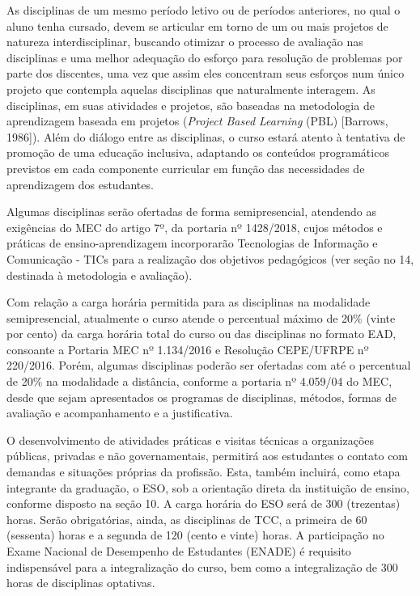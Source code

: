 As disciplinas de um mesmo período letivo ou de períodos anteriores, no qual o aluno tenha cursado, devem se articular em torno de um ou mais projetos de natureza interdisciplinar, buscando otimizar o processo de avaliação nas disciplinas e uma melhor adequação do esforço para resolução de problemas por parte dos discentes, uma vez que assim eles concentram seus esforços num único projeto que contempla aquelas disciplinas que naturalmente interagem. As disciplinas, em suas atividades e projetos, são baseadas na metodologia de aprendizagem baseada em projetos (\textit{Project Based Learning} (PBL) [Barrows, 1986]). Além do diálogo entre as disciplinas, o curso estará atento à tentativa de promoção de uma educação inclusiva, adaptando os conteúdos programáticos previstos em cada componente curricular em função das necessidades de aprendizagem dos estudantes.

Algumas disciplinas serão ofertadas de forma semipresencial, atendendo as exigências do MEC do artigo 7º, da portaria nº 1428/2018, cujos métodos e práticas de ensino-aprendizagem incorporarão Tecnologias de Informação e Comunicação - TICs para a realização dos objetivos pedagógicos (ver seção no 14, destinada à metodologia e avaliação).

Com relação a carga horária permitida para as disciplinas na modalidade semipresencial, atualmente o curso atende o percentual máximo de 20\% (vinte por cento) da carga horária total do curso ou das disciplinas no formato EAD, consoante a Portaria MEC nº 1.134/2016 e Resolução CEPE/UFRPE nº 220/2016. Porém, algumas disciplinas poderão ser ofertadas com até o percentual de 20\% na modalidade a distância, conforme a portaria nº 4.059/04 do MEC, desde que sejam apresentados os programas de disciplinas, métodos, formas de avaliação e acompanhamento e a justificativa.

O desenvolvimento de atividades práticas e visitas técnicas a organizações públicas, privadas e não governamentais, permitirá aos estudantes o contato com demandas e situações próprias da profissão. Esta, também incluirá, como etapa integrante da graduação, o ESO, sob a orientação direta da instituição de ensino, conforme disposto na seção 10. A carga horária do ESO será de 300 (trezentas) horas. Serão obrigatórias, ainda, as disciplinas de TCC, a primeira de 60 (sessenta) horas e a segunda de 120 (cento e vinte) horas. A participação no Exame Nacional de Desempenho de Estudantes (ENADE) é requisito indispensável para a integralização do curso, bem como a integralização de 300 horas de disciplinas optativas.

